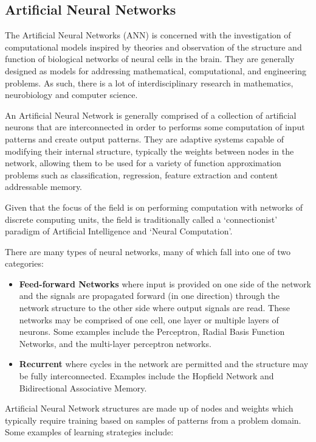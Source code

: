 \begin{bibunit}
\subsection{Artificial Neural Networks}
The Artificial Neural Networks (ANN) is concerned with the investigation of computational models inspired by theories and observation of the structure and function of biological networks of neural cells in the brain. They are generally designed as models for addressing mathematical, computational, and engineering problems. As such, there is a lot of interdisciplinary research in mathematics, neurobiology and computer science. 

An Artificial Neural Network is generally comprised of a collection of artificial neurons that are interconnected in order to performs some computation of input patterns and create output patterns. They are adaptive systems capable of modifying their internal structure, typically the weights between nodes in the network, allowing them to be used for a variety of function approximation problems such as classification, regression, feature extraction and content addressable memory.

Given that the focus of the field is on performing computation with networks of discrete computing units, the field is traditionally called a `connectionist' paradigm of Artificial Intelligence and `Neural Computation'.

There are many types of neural networks, many of which fall into one of two categories:

\begin{itemize}
	\item \textbf{Feed-forward Networks} where input is provided on one side of the network and the signals are propagated forward (in one direction) through the network structure to the other side where output signals are read. These networks may be comprised of one cell, one layer or multiple layers of neurons. Some examples include the Perceptron, Radial Basis Function Networks, and the multi-layer perceptron networks.
	\item \textbf{Recurrent} where cycles in the network are permitted and the structure may be fully interconnected. Examples include the Hopfield Network and Bidirectional Associative Memory.
\end{itemize}

Artificial Neural Network structures are made up of nodes and weights which typically require training based on samples of patterns from a problem domain. Some examples of learning strategies include:


\end{bibunit}
